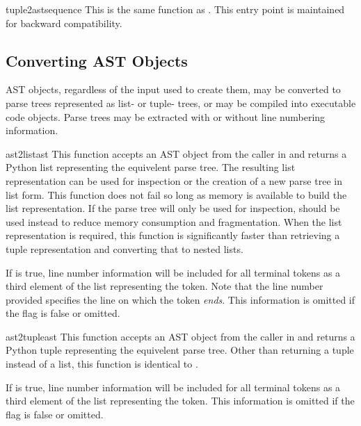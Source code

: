 \begin{funcdesc}{tuple2ast}{sequence}
This is the same function as .  This entry point
is maintained for backward compatibility.
\end{funcdesc}


\subsection{Converting AST Objects}
\label{Converting ASTs}

AST objects, regardless of the input used to create them, may be
converted to parse trees represented as list- or tuple- trees, or may
be compiled into executable code objects.  Parse trees may be
extracted with or without line numbering information.

\begin{funcdesc}{ast2list}{ast}
This function accepts an AST object from the caller in
 and returns a Python list representing the
equivelent parse tree.  The resulting list representation can be used
for inspection or the creation of a new parse tree in list form.  This
function does not fail so long as memory is available to build the
list representation.  If the parse tree will only be used for
inspection,  should be used instead to reduce memory
consumption and fragmentation.  When the list representation is
required, this function is significantly faster than retrieving a
tuple representation and converting that to nested lists.

If  is true, line number information will be
included for all terminal tokens as a third element of the list
representing the token.  Note that the line number provided specifies
the line on which the token \emph{ends}.  This information is
omitted if the flag is false or omitted.
\end{funcdesc}

\begin{funcdesc}{ast2tuple}{ast}
This function accepts an AST object from the caller in
 and returns a Python tuple representing the
equivelent parse tree.  Other than returning a tuple instead of a
list, this function is identical to .

If  is true, line number information will be
included for all terminal tokens as a third element of the list
representing the token.  This information is omitted if the flag is
false or omitted.
\end{funcdesc}

